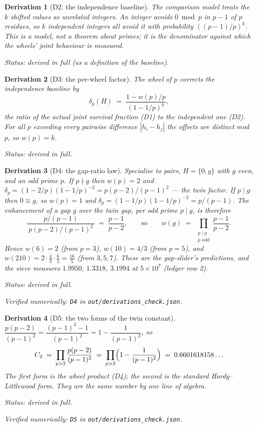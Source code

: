 \documentclass[11pt]{article}
\newtheorem{deriv}{Derivation}
\theoremstyle{remark}
\newcommand{\bucket}[1]{\par\smallskip\noindent\textit{Status: #1.}}
\newcommand{\chk}[1]{\par\noindent\textit{Verified numerically:
\texttt{#1} in \texttt{out/derivations\_check.json}.}}
\begin{document}
\begin{deriv}[D2: the independence baseline]\label{d2}
The comparison model treats the $k$ shifted values as unrelated
integers. An integer avoids $0 \bmod p$ in $p-1$ of $p$ residues, so
$k$ independent integers all avoid it with probability
$\left((p-1)/p\right)^k$. This is a \emph{model}, not a theorem about
primes; it is the denominator against which the wheels' joint behaviour
is measured.
\bucket{derived in full (as a definition of the baseline)}
\end{deriv}

\begin{deriv}[D3: the per-wheel factor]\label{d3}
The wheel of $p$ corrects the independence baseline by
\[
\delta_p(H) \;=\; \frac{1 - w(p)/p}{(1 - 1/p)^k},
\]
the ratio of the actual joint survival fraction (D1) to the independent
one (D2). For all $p$ exceeding every pairwise difference $|h_i - h_j|$
the offsets are distinct mod $p$, so $w(p) = k$.
\bucket{derived in full}
\end{deriv}

\begin{deriv}[D4: the gap-ratio law]\label{d4}
Specialise to pairs, $H = \{0, g\}$ with $g$ even, and an odd prime
$p$. If $p \nmid g$ then $w(p) = 2$ and
$\delta_p = (1 - 2/p)(1 - 1/p)^{-2} = p(p-2)/(p-1)^2$ --- the twin
factor. If $p \mid g$ then $0 \equiv g$, so $w(p) = 1$ and
$\delta_p = (1 - 1/p)(1-1/p)^{-2} = p/(p-1)$. The enhancement of a gap
$g$ over the twin gap, per odd prime $p \mid g$, is therefore
\[
\frac{p/(p-1)}{\,p(p-2)/(p-1)^2\,} \;=\; \frac{p-1}{p-2},
\qquad\text{so}\qquad
w(g) \;=\; \prod_{\substack{p \mid g \\ p \text{ odd}}} \frac{p-1}{p-2}.
\]
Hence $w(6) = 2$ (from $p{=}3$), $w(10) = 4/3$ (from $p{=}5$), and
$w(210) = 2 \cdot \tfrac43 \cdot \tfrac65 = \tfrac{16}{5}$ (from
$3, 5, 7$). These are the gap-slider's predictions, and the sieve
measures $1.9950$, $1.3318$, $3.1994$ at $5\times10^7$ (ledger row 2).
\bucket{derived in full}\chk{D4}
\end{deriv}

\begin{deriv}[D5: the two forms of the twin constant]\label{d5}
$\dfrac{p(p-2)}{(p-1)^2} = \dfrac{(p-1)^2 - 1}{(p-1)^2}
= 1 - \dfrac{1}{(p-1)^2}$, so
\[
C_2 \;=\; \prod_{p > 2} \frac{p(p-2)}{(p-1)^2}
      \;=\; \prod_{p > 2} \Bigl(1 - \frac{1}{(p-1)^2}\Bigr)
      \;=\; 0.6601618158\ldots
\]
The first form is the wheel product (D4); the second is the standard
Hardy--Littlewood form. They are the same number by one line of algebra.
\bucket{derived in full}\chk{D5}
\end{deriv}
\end{document}

